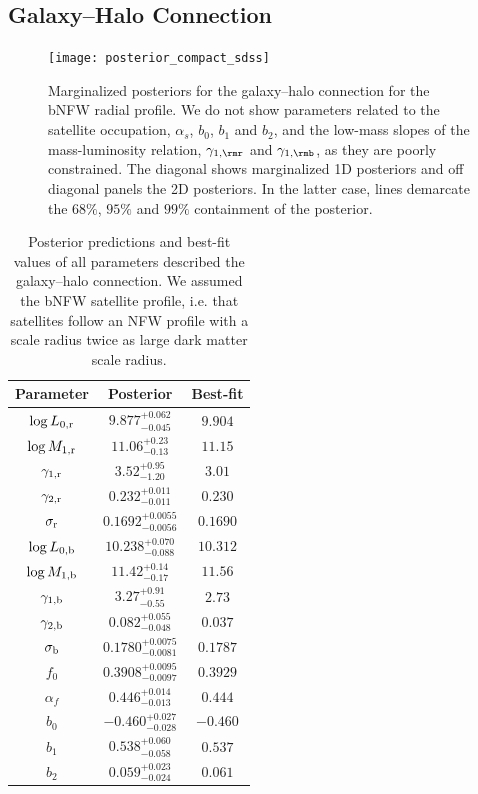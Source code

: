 \documentclass[fleqn,usenatbib,useAMS]{mnras}
\begin{document}
\subsection{Galaxy--Halo Connection}

\begin{figure}
	\centering
	\texttt{[image: posterior\_compact\_sdss]}
	\caption{Marginalized posteriors for the galaxy--halo connection for the bNFW radial profile. We do not show parameters related to the satellite occupation, $\alpha_s$, $b_0$, $b_1$ and $b_2$, and the low-mass slopes of the mass-luminosity relation, $\gamma_{1, \rmr}$ and $\gamma_{1, \rmb}$, as they are poorly constrained. The diagonal shows marginalized 1D posteriors and off diagonal panels the 2D posteriors. In the latter case, lines demarcate the $68\%$, $95\%$ and $99\%$ containment of the posterior.}
	\label{fig:posterior}
\end{figure}

\begin{table}
	\centering
	\begin{tabular}{c|c|c}
		\hline
		Parameter & Posterior & Best-fit \\
		\hline\hline
		$\log L_{\rm 0, r}$ & $9.877^{+0.062}_{-0.045}$ & $9.904$ \\
		$\log M_{\rm 1, r}$ & $11.06^{+0.23}_{-0.13}$ & $11.15$ \\
		$\gamma_{\rm 1, r}$ & $3.52^{+0.95}_{-1.20}$ & $3.01$ \\
		$\gamma_{\rm 2, r}$ & $0.232^{+0.011}_{-0.011}$ & $0.230$ \\
		$\sigma_{\rm r}$ & $0.1692^{+0.0055}_{-0.0056}$ & $0.1690$ \\
		$\log L_{\rm 0, b}$ & $10.238^{+0.070}_{-0.088}$ & $10.312$ \\
		$\log M_{\rm 1, b}$ & $11.42^{+0.14}_{-0.17}$ & $11.56$ \\
		$\gamma_{\rm 1, b}$ & $3.27^{+0.91}_{-0.55}$ & $2.73$ \\
		$\gamma_{\rm 2, b}$ & $0.082^{+0.055}_{-0.048}$ & $0.037$ \\
		$\sigma_{\rm b}$ & $0.1780^{+0.0075}_{-0.0081}$ & $0.1787$ \\
		$f_0$ & $0.3908^{+0.0095}_{-0.0097}$ & $0.3929$ \\
		$\alpha_f$ & $0.446^{+0.014}_{-0.013}$ & $0.444$ \\
		$b_0$ & $-0.460^{+0.027}_{-0.028}$ & $-0.460$ \\
		$b_1$ & $0.538^{+0.060}_{-0.058}$ & $0.537$ \\
		$b_2$ & $0.059^{+0.023}_{-0.024}$ & $0.061$ \\
		\hline
	\end{tabular}
	\caption{Posterior predictions and best-fit values of all parameters described the galaxy--halo connection. We assumed the bNFW satellite profile, i.e. that satellites follow an NFW profile with a scale radius twice as large dark matter scale radius.}
	\label{tab:posterior}
\end{table}
\end{document}
